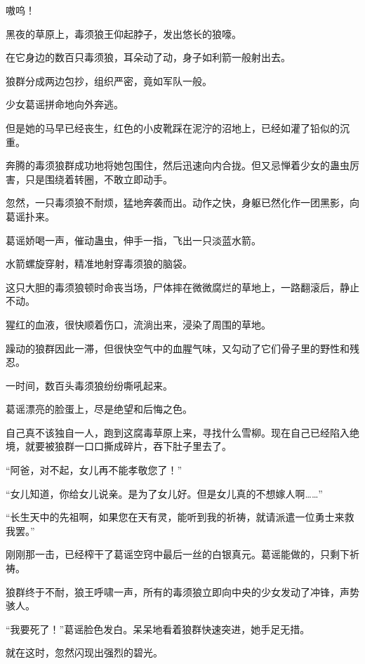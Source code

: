 
\begin{this_body}



嗷呜！

黑夜的草原上，毒须狼王仰起脖子，发出悠长的狼嚎。

在它身边的数百只毒须狼，耳朵动了动，身子如利箭一般射出去。

狼群分成两边包抄，组织严密，竟如军队一般。

少女葛谣拼命地向外奔逃。

但是她的马早已经丧生，红色的小皮靴踩在泥泞的沼地上，已经如灌了铅似的沉重。

奔腾的毒须狼群成功地将她包围住，然后迅速向内合拢。但又忌惮着少女的蛊虫厉害，只是围绕着转圈，不敢立即动手。

忽然，一只毒须狼不耐烦，猛地奔袭而出。动作之快，身躯已然化作一团黑影，向葛谣扑来。

葛谣娇喝一声，催动蛊虫，伸手一指，飞出一只淡蓝水箭。

水箭螺旋穿射，精准地射穿毒须狼的脑袋。

这只大胆的毒须狼顿时命丧当场，尸体摔在微微腐烂的草地上，一路翻滚后，静止不动。

猩红的血液，很快顺着伤口，流淌出来，浸染了周围的草地。

躁动的狼群因此一滞，但很快空气中的血腥气味，又勾动了它们骨子里的野性和残忍。

一时间，数百头毒须狼纷纷嘶吼起来。

葛谣漂亮的脸蛋上，尽是绝望和后悔之色。

自己真不该独自一人，跑到这腐毒草原上来，寻找什么雪柳。现在自己已经陷入绝境，就要被狼群一口口撕成碎片，吞下肚子里去了。

“阿爸，对不起，女儿再不能孝敬您了！”

“女儿知道，你给女儿说亲。是为了女儿好。但是女儿真的不想嫁人啊……”

“长生天中的先祖啊，如果您在天有灵，能听到我的祈祷，就请派遣一位勇士来救我罢。”

刚刚那一击，已经榨干了葛谣空窍中最后一丝的白银真元。葛谣能做的，只剩下祈祷。

狼群终于不耐，狼王呼啸一声，所有的毒须狼立即向中央的少女发动了冲锋，声势骇人。

“我要死了！”葛谣脸色发白。呆呆地看着狼群快速突进，她手足无措。

就在这时，忽然闪现出强烈的碧光。


\end{this_body}
